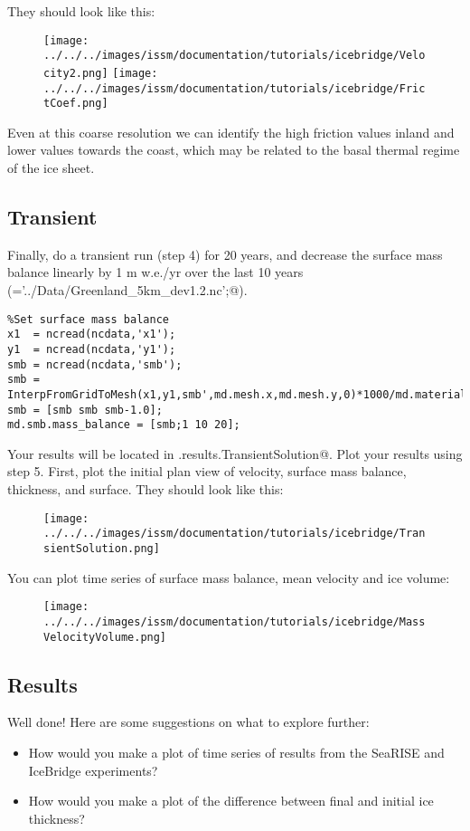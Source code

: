 They should look like this:
\begin{figure}[H]
	\begin{center}
		\texttt{[image: ../../../images/issm/documentation/tutorials/icebridge/Velocity2.png]}
		\texttt{[image: ../../../images/issm/documentation/tutorials/icebridge/FrictCoef.png]}
	\end{center}
\end{figure}
Even at this coarse resolution we can identify the high friction values inland and lower values towards the coast, which may be related to the basal thermal regime of the ice sheet.

\subsection{Transient} %
Finally, do a transient run (step 4) for 20 years, and decrease the surface mass balance linearly by 1 m w.e./yr over the last 10 years (\verb@ncdata='../Data/Greenland_5km_dev1.2.nc';@).
\begin{verbatim}%Set surface mass balance
x1  = ncread(ncdata,'x1');
y1  = ncread(ncdata,'y1');
smb = ncread(ncdata,'smb');
smb = InterpFromGridToMesh(x1,y1,smb',md.mesh.x,md.mesh.y,0)*1000/md.materials.rho_ice;
smb = [smb smb smb-1.0];
md.smb.mass_balance = [smb;1 10 20];\end{verbatim}

Your results will be located in \verb@md.results.TransientSolution@. Plot your results using step 5. First, plot the initial plan view of velocity, surface mass balance, thickness, and surface. They should look like this:
\begin{figure}[H]
	\begin{center}
		\texttt{[image: ../../../images/issm/documentation/tutorials/icebridge/TransientSolution.png]}
	\end{center}
\end{figure}
You can plot time series of surface mass balance, mean velocity and ice volume:
\begin{figure}[H]
	\begin{center}
		\texttt{[image: ../../../images/issm/documentation/tutorials/icebridge/MassVelocityVolume.png]}
	\end{center}
\end{figure}

\subsection{Results} %
Well done! Here are some suggestions on what to explore further:
\begin{itemize}
	\item How would you make a plot of time series of results from the SeaRISE and IceBridge experiments?
	\item How would you make a plot of the difference between final and initial ice thickness?
\end{itemize}

